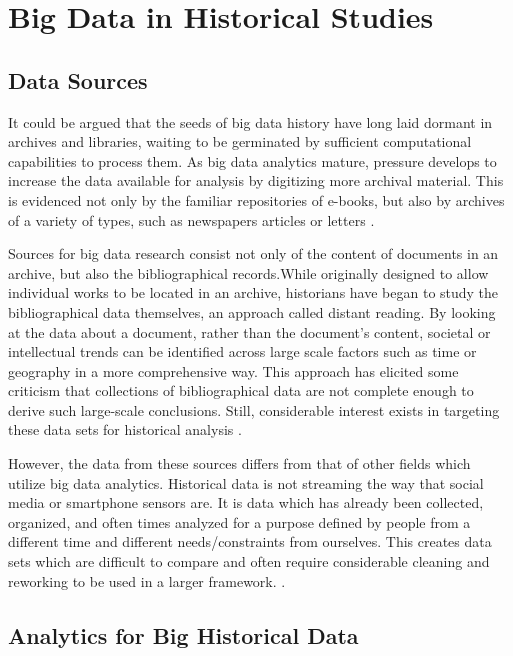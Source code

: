 \documentclass[sigconf]{acmart}
\begin{document}
\section{Big Data in Historical Studies}

\subsection{Data Sources}

It could be argued that the seeds of big data history have long laid dormant in  archives and libraries, waiting to be germinated by sufficient computational capabilities to process them. As big data analytics mature, pressure develops to increase the data available for analysis by digitizing more archival material. This is evidenced not only by the familiar repositories of e-books, but also by archives of a variety of types, such as newspapers articles \cite{bdglobalhist} or letters \cite{digitalrepublicletters}.

Sources for big data research consist not only of the content of documents in an archive, but also the bibliographical records.While originally designed to allow individual works to be located in an archive, historians have began to study the bibliographical data themselves, an approach called distant reading. By looking at the data about a document, rather than the document's content, societal or intellectual trends can be identified across large scale factors such as time or geography in a more comprehensive way. This approach has elicited some criticism that collections of bibliographical data are not complete enough to derive such large-scale conclusions. Still, considerable interest exists in targeting these data sets for historical analysis \cite{musichist}.

However, the data from these sources differs from that of other fields which utilize big data analytics. Historical data is not streaming the way that social media or smartphone sensors are. It is data which has already been collected, organized, and often times analyzed for a purpose defined by people from a different time and different needs/constraints from ourselves. This creates data sets which are difficult to compare and often require considerable cleaning and reworking to be used in a larger framework. \cite{digitalrepublicletters}.

\subsection{Analytics for Big Historical Data}
\end{document}
